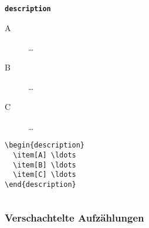 \begin{frame}[fragile]
\begin{columns}[T]
\begin{column}{0.31\textwidth}
			\begin{block}{\tt\bfseries description}
				\begin{description}
					\item[A] \ldots \item[B] \ldots \item[C] \ldots
				\end{description} 
				\begin{lstlisting}
\begin{description}
  \item[A] \ldots
  \item[B] \ldots
  \item[C] \ldots
\end{description}
				\end{lstlisting}
			\end{block}
		\end{column}
	\end{columns}
\end{frame}

\begin{frame}[fragile]
	\frametitle{Verschachtelte Aufzählungen}
	\vspace{-0.9cm}
\end{frame}